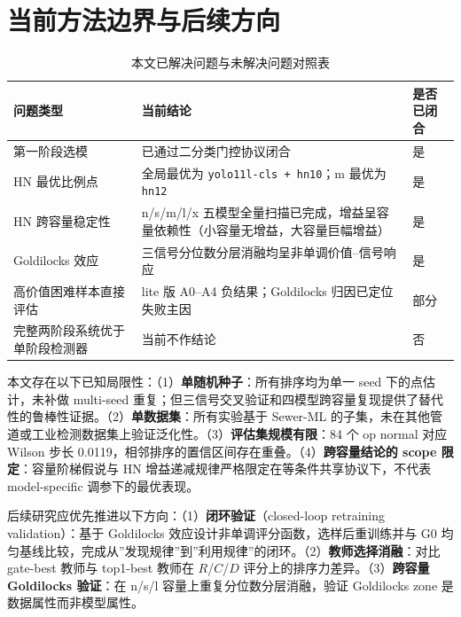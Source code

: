 \documentclass[UTF8,openany,12pt]{ctexbook}
\begin{document}
\section{当前方法边界与后续方向}
\begin{table}[H]
    \centering
    \caption{本文已解决问题与未解决问题对照表}
    \label{tab:stage1-solved-unsolved}
    \begin{tabularx}{\textwidth}{p{4.0cm}Xp{2.4cm}}
        \toprule
        问题类型 & 当前结论 & 是否已闭合 \\
        \midrule
        第一阶段选模 & 已通过二分类门控协议闭合 & 是 \\
        HN 最优比例点 & 全局最优为 \texttt{yolo11l-cls + hn10}；m 最优为 \texttt{hn12} & 是 \\
        HN 跨容量稳定性 & n/s/m/l/x 五模型全量扫描已完成，增益呈容量依赖性（小容量无增益，大容量巨幅增益） & 是 \\
        Goldilocks 效应 & 三信号分位数分层消融均呈非单调价值--信号响应 & 是 \\
        高价值困难样本直接评估 & lite 版 A0--A4 负结果；Goldilocks 归因已定位失败主因 & 部分 \\
        完整两阶段系统优于单阶段检测器 & 当前不作结论 & 否 \\
        \bottomrule
    \end{tabularx}
\end{table}

本文存在以下已知局限性：（1）\textbf{单随机种子}：所有排序均为单一 seed 下的点估计，未补做 multi-seed 重复；但三信号交叉验证和四模型跨容量复现提供了替代性的鲁棒性证据。（2）\textbf{单数据集}：所有实验基于 Sewer-ML 的子集，未在其他管道或工业检测数据集上验证泛化性。（3）\textbf{评估集规模有限}：84 个 op normal 对应 Wilson 步长 0.0119，相邻排序的置信区间存在重叠。（4）\textbf{跨容量结论的 scope 限定}：容量阶梯假说与 HN 增益递减规律严格限定在等条件共享协议下，不代表 model-specific 调参下的最优表现。

后续研究应优先推进以下方向：（1）\textbf{闭环验证}（closed-loop retraining validation）：基于 Goldilocks 效应设计非单调评分函数，选样后重训练并与 G0 均匀基线比较，完成从”发现规律”到”利用规律”的闭环。（2）\textbf{教师选择消融}：对比 gate-best 教师与 top1-best 教师在 $R$/$C$/$D$ 评分上的排序力差异。（3）\textbf{跨容量 Goldilocks 验证}：在 n/s/l 容量上重复分位数分层消融，验证 Goldilocks zone 是数据属性而非模型属性。

\appendix
\end{document}

